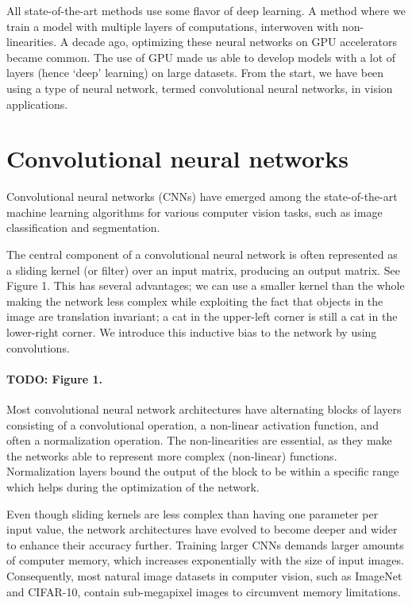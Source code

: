 \documentclass[
  12pt,
  a5,margin=2cmpaper,
]{article}
\begin{document}
All state-of-the-art methods use some flavor of deep learning. A method
where we train a model with multiple layers of computations, interwoven
with non-linearities. A decade ago, optimizing these neural networks on
GPU accelerators became common. The use of GPU made us able to develop
models with a lot of layers (hence `deep' learning) on large datasets.
From the start, we have been using a type of neural network, termed
convolutional neural networks, in vision applications.

\hypertarget{convolutional-neural-networks}{%
\section{Convolutional neural
networks}\label{convolutional-neural-networks}}

Convolutional neural networks (CNNs) have emerged among the
state-of-the-art machine learning algorithms for various computer vision
tasks, such as image classification and segmentation.

The central component of a convolutional neural network is often
represented as a sliding kernel (or filter) over an input matrix,
producing an output matrix. See Figure 1. This has several advantages;
we can use a smaller kernel than the whole making the network less
complex while exploiting the fact that objects in the image are
translation invariant; a cat in the upper-left corner is still a cat in
the lower-right corner. We introduce this inductive bias to the network
by using convolutions.

\hypertarget{todo-figure-1.}{%
\paragraph{TODO: Figure 1.}\label{todo-figure-1.}}

Most convolutional neural network architectures have alternating blocks
of layers consisting of a convolutional operation, a non-linear
activation function, and often a normalization operation. The
non-linearities are essential, as they make the networks able to
represent more complex (non-linear) functions. Normalization layers
bound the output of the block to be within a specific range which helps
during the optimization of the network.

Even though sliding kernels are less complex than having one parameter
per input value, the network architectures have evolved to become deeper
and wider to enhance their accuracy further. Training larger CNNs
demands larger amounts of computer memory, which increases exponentially
with the size of input images. Consequently, most natural image datasets
in computer vision, such as ImageNet and CIFAR-10, contain sub-megapixel
images to circumvent memory limitations.
\end{document}
